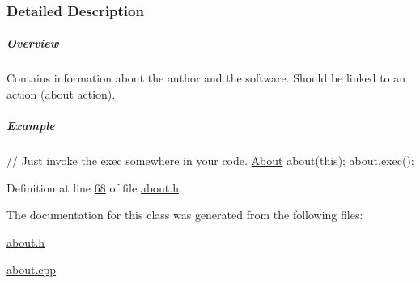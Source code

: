 \subsubsection{Detailed Description}
\subparagraph*{Overview}

Contains information about the author and the software. Should be linked to an action (about action).

\subparagraph*{Example}


\begin{DoxyCode}
\textcolor{comment}{// Just invoke the exec somewhere in your code.}
\hyperlink{class_about}{About} about(\textcolor{keyword}{this});
about.exec();
\end{DoxyCode}
 

Definition at line \hyperlink{about_8h_source_l00068}{68} of file \hyperlink{about_8h_source}{about.\+h}.



The documentation for this class was generated from the following files\+:\begin{DoxyCompactItemize}
\item 
\hyperlink{about_8h}{about.\+h}\item 
\hyperlink{about_8cpp}{about.\+cpp}\end{DoxyCompactItemize}
